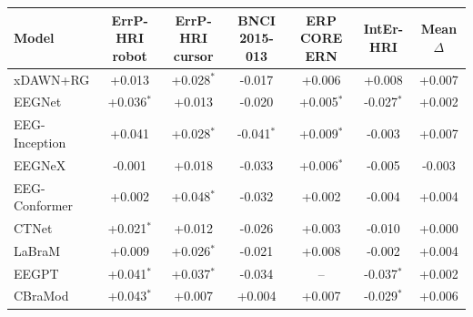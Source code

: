 \begin{tabular}{lcccccc}
\toprule
Model & ErrP-HRI robot & ErrP-HRI cursor & BNCI 2015-013 & ERP CORE ERN & IntEr-HRI & Mean $\Delta$ \\
\midrule
xDAWN+RG & +0.013 & +0.028$^{\ast}$ & -0.017 & +0.006 & +0.008 & +0.007 \\
EEGNet & +0.036$^{\ast}$ & +0.013 & -0.020 & +0.005$^{\ast}$ & -0.027$^{\ast}$ & +0.002 \\
EEG-Inception & +0.041 & +0.028$^{\ast}$ & -0.041$^{\ast}$ & +0.009$^{\ast}$ & -0.003 & +0.007 \\
EEGNeX & -0.001 & +0.018 & -0.033 & +0.006$^{\ast}$ & -0.005 & -0.003 \\
EEG-Conformer & +0.002 & +0.048$^{\ast}$ & -0.032 & +0.002 & -0.004 & +0.004 \\
CTNet & +0.021$^{\ast}$ & +0.012 & -0.026 & +0.003 & -0.010 & +0.000 \\
LaBraM & +0.009 & +0.026$^{\ast}$ & -0.021 & +0.008 & -0.002 & +0.004 \\
EEGPT & +0.041$^{\ast}$ & +0.037$^{\ast}$ & -0.034 & -- & -0.037$^{\ast}$ & +0.002 \\
CBraMod & +0.043$^{\ast}$ & +0.007 & +0.004 & +0.007 & -0.029$^{\ast}$ & +0.006 \\
\bottomrule
\end{tabular}
